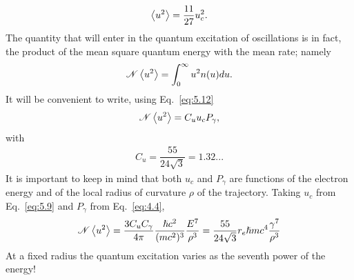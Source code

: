 \begin{align}
	\left< u^2 \right> = \dfrac{11}{27} u_c^2.
\end{align}
The quantity that will enter in the quantum excitation of oscillations is in fact, the product of the mean square quantum energy with the mean rate; namely
\begin{align} \label{eq:5.17}
	\mathscr{N} \left< u^2 \right> = \int_0^\infty u^2 n(u) du.
\end{align}
It will be convenient to write, using Eq.~\eqref{eq:5.12}
\begin{align} \label{eq:5.18}
	\mathscr{N} \left< u^2 \right> = C_u u_c P_\gamma,
\end{align}
with
\begin{align}
	C_u = \dfrac{55}{24\sqrt{3}} = 1.32...
\end{align}
It is important to keep in mind that both $u_c$ and $P_\gamma$ are functions of the electron
energy and of the local radius of curvature $\rho$ of the trajectory. Taking $u_c$ from Eq.~\eqref{eq:5.9} and $P_\gamma$ from Eq.~\eqref{eq:4.4},
\begin{align}
	\mathscr{N} \left< u^2 \right> = \dfrac{3 C_u C_\gamma}{4 \pi} \dfrac{\hslash c^2}{(mc^2)^3} \dfrac{E^7}{\rho^3} = \dfrac{55}{24\sqrt{3}} r_e \hslash mc^4 \dfrac{\gamma^7}{\rho^3}
\end{align}
At a fixed radius the quantum excitation varies as the seventh power of the energy!
